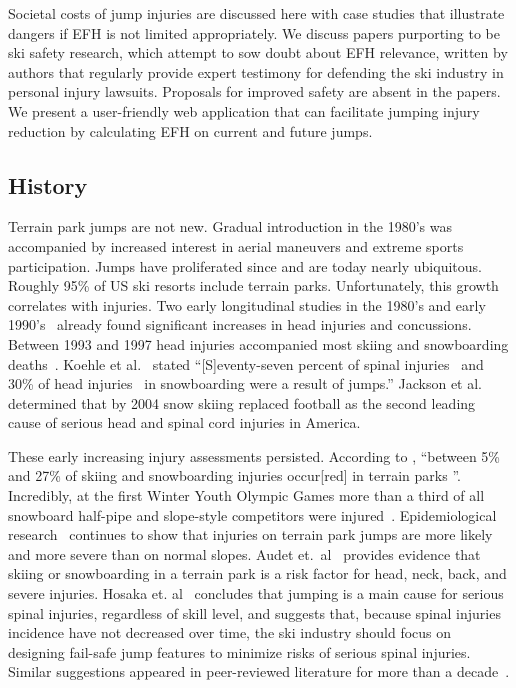 \documentclass[smallextended]{svjour3}       %
\begin{document}
Societal costs of jump injuries are discussed here with case studies that
illustrate dangers if EFH is not limited appropriately. We discuss papers
purporting to be ski safety research, which attempt to sow doubt about EFH
relevance, written by authors that regularly provide expert testimony for
defending the ski industry in personal injury lawsuits. Proposals for improved
safety are absent in the papers. We present a user-friendly web application
that can facilitate jumping injury reduction by calculating EFH on current and
future jumps.

\subsection{History}
\label{sec:hist}
%
Terrain park jumps are not new. Gradual introduction in the 1980's was
accompanied by increased interest in aerial maneuvers and extreme sports
participation. Jumps have proliferated since and are today nearly ubiquitous.
Roughly 95\% of US ski resorts include terrain parks. Unfortunately, this
growth correlates with injuries. Two early longitudinal studies in the 1980's
and early 1990's~\cite{Deibert1998,Furrer1995} already found significant
increases in head injuries and concussions. Between 1993 and 1997 head injuries
accompanied most skiing and snowboarding deaths~\cite{CPSC1999}. Koehle et
al.~\cite{Koehle2002} stated ``[S]eventy-seven percent of spinal
injuries~\cite{Tarazi1999} and 30\% of head injuries~\cite{Fukuda2001} in
snowboarding were a result of jumps.'' Jackson et al.~\cite{Jackson2004}
determined that by 2004 snow skiing replaced football as the second leading
cause of serious head and spinal cord injuries in America.

These early increasing injury assessments persisted. According to
\cite{Russell2014}, ``between 5\% and 27\% of skiing and snowboarding injuries
occur[red] in terrain parks
\cite{Bridges2003,Goulet2007,Moffat2009,Greve2009,Brooks2010,Ruedl2013}''.
Incredibly, at the first Winter Youth Olympic Games more than a third of all
snowboard half-pipe and slope-style competitors were injured~\cite{Ruedl2012}.
Epidemiological research~\cite{Carus2016,Audet2020,Hosaka2020} continues to
show that injuries on terrain park jumps are more likely and more severe than
on normal slopes. Audet et.~al~\cite{Audet2020} provides evidence that skiing
or snowboarding in a terrain park is a risk factor for head, neck, back, and
severe injuries. Hosaka et. al~\cite{Hosaka2020} concludes that jumping is a
main cause for serious spinal injuries, regardless of skill level, and suggests
that, because spinal injuries incidence  have not decreased over time,  the ski
industry should focus on designing fail-safe jump features to minimize risks of
serious spinal injuries. Similar suggestions appeared in peer-reviewed
literature for more than a
decade~\cite{Hubbard2009,Swedberg2012,McNeil2012,McNeil2012a,Hubbard2015,Levy2015,Petrone2017,Moore2018}.
\end{document}
